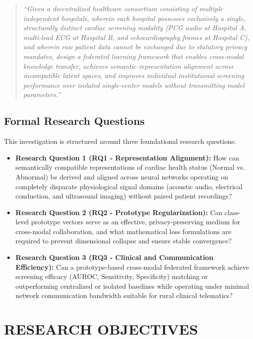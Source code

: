 \documentclass[12pt,a4paper]{amritareport}
\begin{document}
\begin{quote}
	\textit{``Given a decentralized healthcare consortium consisting of multiple independent hospitals, wherein each hospital possesses exclusively a single, structurally distinct cardiac screening modality (PCG audio at Hospital A, multi-lead ECG at Hospital B, and echocardiography frames at Hospital C), and wherein raw patient data cannot be exchanged due to statutory privacy mandates, design a federated learning framework that enables cross-modal knowledge transfer, achieves semantic representation alignment across incompatible latent spaces, and improves individual institutional screening performance over isolated single-center models without transmitting model parameters.''}
\end{quote}

\subsection{Formal Research Questions}
This investigation is structured around three foundational research questions:
\begin{itemize}
	\item \textbf{Research Question 1 (RQ1 - Representation Alignment):} How can semantically compatible representations of cardiac health status (Normal vs. Abnormal) be derived and aligned across neural networks operating on completely disparate physiological signal domains (acoustic audio, electrical conduction, and ultrasound imaging) without paired patient recordings?
	\item \textbf{Research Question 2 (RQ2 - Prototype Regularization):} Can class-level prototype vectors serve as an effective, privacy-preserving medium for cross-modal collaboration, and what mathematical loss formulations are required to prevent dimensional collapse and ensure stable convergence?
	\item \textbf{Research Question 3 (RQ3 - Clinical and Communication Efficiency):} Can a prototype-based cross-modal federated framework achieve screening efficacy (AUROC, Sensitivity, Specificity) matching or outperforming centralized or isolated baselines while operating under minimal network communication bandwidth suitable for rural clinical telematics?
\end{itemize}


\section{RESEARCH OBJECTIVES}
\end{document}
